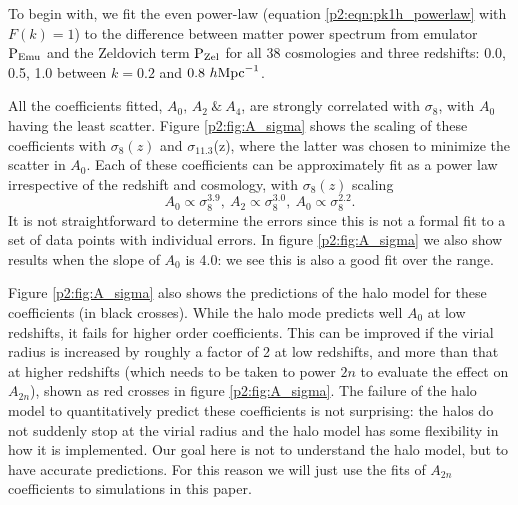 \documentclass[
  11pt,
  twoside,
  openright,
  titlepage,
  headings=optiontoheadandtoc
]{scrbook}
\begin{document}
\clearpage

To begin with, we fit the even power-law (equation \ref{p2:eqn:pk1h_powerlaw} with $F(k)=1$) to the difference between matter power spectrum from emulator $\rm{P_{Emu}}$ and the Zeldovich term $\rm{P_{Zel}}$ for all 38 cosmologies and three redshifts: 0.0, 0.5, 1.0 between $k = 0.2$ and $0.8\ h \rm{Mpc}^{-1}$. 

All the coefficients fitted, $A_0, \, A_2 \ \& \ A_4$, are strongly correlated with $\sigma_8$, with 
$A_0$ having the least scatter. Figure \ref{p2:fig:A_sigma} shows the scaling of these coefficients with $\sigma_8(z)$ and $\sigma_{11.3}$(z), where the latter was chosen to minimize the scatter in $A_0$.
Each of these coefficients can be approximately fit as a power law irrespective of the redshift and cosmology,
with $\sigma_8(z)$ scaling
\begin{equation}
 	A_0 \propto \sigma_{8}^{3.9},\ A_2 \propto \sigma_{8}^{3.0},\ A_0 \propto \sigma_{8}^{2.2}.
\label{p2:slopea024}
\end{equation}
It is not straightforward to determine the errors since this is not a formal fit to a set of data points with individual 
errors. In figure \ref{p2:fig:A_sigma} we also show results when the slope of $A_0$ is 4.0: we see this is also a good fit over 
the range. 

Figure \ref{p2:fig:A_sigma} also shows the predictions of the halo model for these coefficients (in black crosses). While the 
halo mode predicts well $A_0$ at low redshifts, it fails for higher order coefficients. This can be improved 
if the virial radius is increased by roughly a factor of 2 at low redshifts, and more than that at higher redshifts
(which needs to be taken to power $2n$ to evaluate the effect on $A_{2n}$), shown as red crosses in figure \ref{p2:fig:A_sigma}. The failure of the halo model to quantitatively 
predict these coefficients is not surprising: the halos do not suddenly stop at the virial radius and the halo model has 
some flexibility in how it is implemented. Our goal here is not to understand the halo model, but to have accurate 
predictions.  For this reason we will just use the fits of $A_{2n}$ coefficients to simulations in this paper. 
\end{document}
